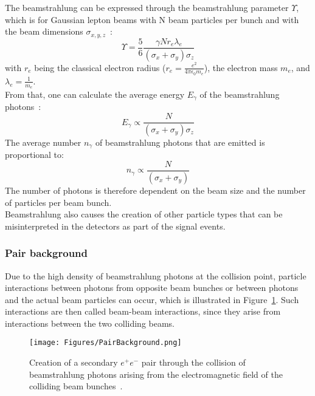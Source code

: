The beamstrahlung can be expressed through the beamstrahlung parameter $\Upsilon$, which is for Gaussian lepton beams with N beam particles per bunch and with the beam dimensions $\sigma_{x,y,z}$~\cite{PairBkg_cross_section, AndreSailer}:
\begin{equation}
 \Upsilon=\frac{5}{6}\frac{\gamma N r_e \lambda_e}{(\sigma_x+\sigma_y)\sigma_z}
\end{equation}
with $r_e$ being the classical electron radius ($r_e = \frac{e^2}{4\pi \epsilon_0 m_e}$), the electron mass $m_e$, and $\lambda_e=\frac{1}{m_e}$.\\
From that, one can calculate the average energy $E_{\gamma}$ of the beamstrahlung photons~\cite[p. 77]{Beamstrahlung_CLIC}:
\begin{equation}
 E_{\gamma} \propto \frac{N}{(\sigma_x+\sigma_y)\sigma_z}
 \label{eq:pair_energy}
\end{equation}
The average number $n_{\gamma}$ of beamstrahlung photons that are emitted is proportional to:
\begin{equation}
 n_{\gamma} \propto \frac{N}{(\sigma_x+\sigma_y)}
 \label{eq:pair_number}
\end{equation}
The number of photons is therefore dependent on the beam size and the number of particles per beam bunch.
\\Beamstrahlung also causes the creation of other particle types that can be misinterpreted in the detectors as part of the signal events.

\subsubsection{Pair background}
\label{BeamBeam:pairs}
Due to the high density of beamstrahlung photons at the collision point, particle interactions between photons from opposite beam bunches or between photons and the actual beam particles can occur, which is illustrated in Figure~\ref{fig:Pair_production}.
Such interactions are then called beam-beam interactions, since they arise from interactions between the two colliding beams.
\begin{figure}
\centering
\texttt{[image: Figures/PairBackground.png]}
\caption{Creation of a secondary $e^+e^-$ pair through the collision of beamstrahlung photons arising from the electromagnetic field of the colliding beam bunches~\cite[p. 29]{Vogel}.}
\label{fig:Pair_production} 
\end{figure}

